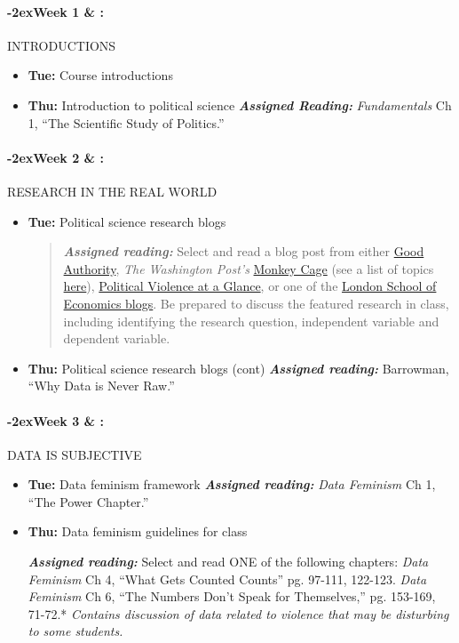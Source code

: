 \documentclass[11pt]{article}
\newcommand{\week}[1]{%
  \paragraph*{\kern-2ex\quad #1 \AdvanceDate[1]\syldate{\today} \& \AdvanceDate[2]\syldate{\today} :}%
  \ifdim\wd1=\wd\MONDAY
    \AdvanceDate[7]
  \else
    \AdvanceDate[7]
  \fi%
}
\begin{document}
\SetDate[08/01/2024]

\week{Week 1} INTRODUCTIONS

\begin{itemize}
    \item [] \textbf{Tue:} Course introductions
    \item [] \textbf{Thu:} Introduction to political science
    \subitem \textbf{\textit{Assigned Reading:}} \textit{Fundamentals} Ch 1, ``The Scientific Study of Politics.''
\end{itemize}


\week{Week 2} RESEARCH IN THE REAL WORLD

\begin{itemize}
    \item [] \textbf{Tue:} Political science research blogs
\begin{quotation}\noindent \textbf{\textit{Assigned reading:}} Select and read a blog post from either \href{https://goodauthority.org/}{Good Authority}, \textit{The Washington Post's} \href{https://www.washingtonpost.com/monkey-cage/}{Monkey Cage} (see a list of topics \href{https://monkeycagetopicguides.org/}{here}), \href{https://politicalviolenceataglance.org/}{Political Violence at a Glance}, or one of the \href{https://blogs.lse.ac.uk/lse-research-blogs/}{London School of Economics blogs}. Be prepared to discuss the featured research in class, including identifying the research question, independent variable and dependent variable. \end{quotation}

    \item []\textbf{Thu:} Political science research blogs (cont)
        \subitem \textbf{\textit{Assigned reading:}} Barrowman, ``Why Data is Never Raw.''
\end{itemize}

    
\week{Week 3} DATA IS SUBJECTIVE

\begin{itemize}
    \item [] \textbf{Tue:} Data feminism framework
        \subitem \textbf{\textit{ Assigned reading:}} \textit{Data Feminism} Ch 1, ``The Power Chapter.''
    
    \item [] \textbf{Thu:} Data feminism guidelines for class
       
       \subitem \textbf{\textit{Assigned reading:}} Select and read ONE of the following chapters: 
        \subsubitem \textit{Data Feminism} Ch 4, ``What Gets Counted Counts'' pg. 97-111, 122-123. 
        \subsubitem \textit{Data Feminism} Ch 6, ``The Numbers Don't Speak for Themselves,'' pg. 153-169, 71-72.*\vspace{-5pt} \subsubitem \textit{\footnotesize*Contains discussion of data related to violence that may be disturbing to some students.}
       
    \end{itemize}
\end{document}
